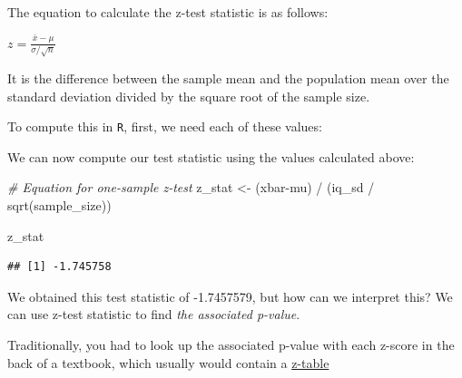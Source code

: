 \documentclass[
]{book}
\newenvironment{Shaded}{\begin{snugshade}}{\end{snugshade}}
\newcommand{\CommentTok}[1]{\textcolor[rgb]{0.56,0.35,0.01}{\textit{#1}}}
\newcommand{\DecValTok}[1]{\textcolor[rgb]{0.00,0.00,0.81}{#1}}
\newcommand{\FunctionTok}[1]{\textcolor[rgb]{0.00,0.00,0.00}{#1}}
\newcommand{\NormalTok}[1]{#1}
\newcommand{\OtherTok}[1]{\textcolor[rgb]{0.56,0.35,0.01}{#1}}
\newcommand{\SpecialCharTok}[1]{\textcolor[rgb]{0.00,0.00,0.00}{#1}}
\begin{document}
The equation to calculate the z-test statistic is as follows:

\(z = \frac{\bar{x}-\mu}{\sigma/\sqrt{n}}\)

It is the difference between the sample mean and the population mean over the standard deviation divided by the square root of the sample size.

To compute this in \texttt{R}, first, we need each of these values:

\begin{Shaded}
\end{Shaded}

We can now compute our test statistic using the values calculated above:

\begin{Shaded}
\begin{Highlighting}[]
\CommentTok{\# Equation for one{-}sample z{-}test}
\NormalTok{z\_stat }\OtherTok{\textless{}{-}}\NormalTok{ (xbar}\SpecialCharTok{{-}}\NormalTok{mu) }\SpecialCharTok{/}\NormalTok{ (iq\_sd }\SpecialCharTok{/} \FunctionTok{sqrt}\NormalTok{(sample\_size)) }

\NormalTok{z\_stat}
\end{Highlighting}
\end{Shaded}

\begin{verbatim}
## [1] -1.745758
\end{verbatim}

We obtained this test statistic of -1.7457579, but how can we interpret this? We can use z-test statistic to find \emph{the associated p-value}.

Traditionally, you had to look up the associated p-value with each z-score in the back of a textbook, which usually would contain a \href{https://www.math.arizona.edu/~rsims/ma464/standardnormaltable.pdf}{z-table}
\end{document}
